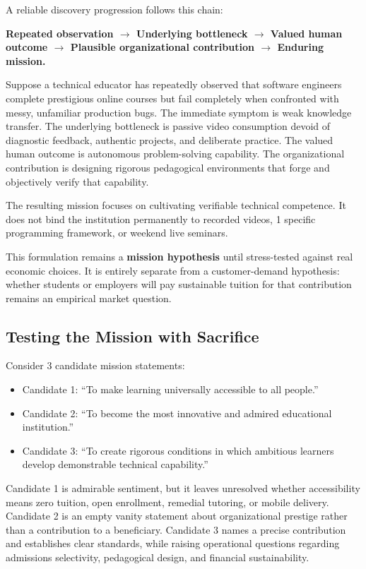 A reliable discovery progression follows this chain:

\begin{center}
\textbf{Repeated observation $\rightarrow$ Underlying bottleneck $\rightarrow$ Valued human outcome $\rightarrow$ Plausible organizational contribution $\rightarrow$ Enduring mission.}
\end{center}

Suppose a technical educator has repeatedly observed that software engineers complete prestigious online courses but fail completely when confronted with messy, unfamiliar production bugs. The immediate symptom is weak knowledge transfer. The underlying bottleneck is passive video consumption devoid of diagnostic feedback, authentic projects, and deliberate practice. The valued human outcome is autonomous problem-solving capability. The organizational contribution is designing rigorous pedagogical environments that forge and objectively verify that capability. 

The resulting mission focuses on cultivating verifiable technical competence. It does not bind the institution permanently to recorded videos, 1 specific programming framework, or weekend live seminars.

This formulation remains a \textbf{mission hypothesis} until stress-tested against real economic choices. It is entirely separate from a customer-demand hypothesis: whether students or employers will pay sustainable tuition for that contribution remains an empirical market question.

\subsection{Testing the Mission with Sacrifice}

Consider 3 candidate mission statements:

\begin{itemize}[leftmargin=11pt,itemsep=1.5pt,topsep=1.5pt,parsep=0pt]
  \item Candidate 1: ``To make learning universally accessible to all people.''
  \item Candidate 2: ``To become the most innovative and admired educational institution.''
  \item Candidate 3: ``To create rigorous conditions in which ambitious learners develop demonstrable technical capability.''
\end{itemize}

Candidate 1 is admirable sentiment, but it leaves unresolved whether accessibility means zero tuition, open enrollment, remedial tutoring, or mobile delivery. Candidate 2 is an empty vanity statement about organizational prestige rather than a contribution to a beneficiary. Candidate 3 names a precise contribution and establishes clear standards, while raising operational questions regarding admissions selectivity, pedagogical design, and financial sustainability.

